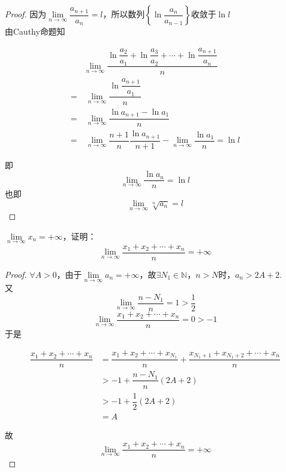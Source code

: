 \begin{proof}

    因为$\lim\limits_{n \to \infty}{\dfrac{a_{n + 1}}{a_n}} = l$，所以数列$\left\{ \ln{\dfrac{a_n}{a_{n - 1}}} \right\}$收敛于$\ln{l}$ \\
    由\textup{Cauthy}命题知
    
    \begin{align*}
        & \lim\limits_{n \to \infty}{\dfrac{\ln{\dfrac{a_2}{a_1}} + \ln{\dfrac{a_3}{a_2}} + \cdots + \ln{\dfrac{a_{n + 1}}{a_n}}}{n}} \\
        = & \ \lim\limits_{n \to \infty}{\dfrac{\ln{\dfrac{a_{n + 1}}{a_1}}}{n}} \\
        = & \ \lim\limits_{n \to \infty}{\dfrac{\ln{a_{n + 1} - \ln{a_1}}}{n}} \\
        = & \ \lim\limits_{n \to \infty}{\dfrac{n + 1}{n}\dfrac{\ln{a_{n + 1}}}{n + 1}} - \lim\limits_{n \to \infty}{\dfrac{\ln{a_1}}{n}} = \ln{l}
    \end{align*}

    即
    $$\lim\limits_{n \to \infty}{\dfrac{\ln{a_n}}{n}} = \ln{l}$$
    也即
    $$\lim\limits_{n \to \infty}{\sqrt[n]{a_n}} = l$$

\end{proof}

\begin{proposition}

    $\lim\limits_{n \to \infty}{x_n} = +\infty$，证明：
    $$\lim\limits_{n \to \infty}{\dfrac{x_1 + x_2 + \cdots + x_n}{n}} = +\infty$$

\end{proposition}

\begin{proof} 

    $\forall A > 0$，由于$\lim\limits_{n \to \infty}{a_n} = +\infty$，故$\exists N_1 \in \mathbb{N}$，$n>N$时，$a_n > 2A + 2$. \\
    又
    $$\lim\limits_{n \to \infty}{\dfrac{n - N_1}{n}} = 1 > \dfrac{1}{2}$$
    $$\lim\limits_{n \to \infty}{\dfrac{x_1 + x_2 + \cdots + x_n}{n}} = 0 > -1$$
    于是

    \begin{align*}
        \dfrac{x_1 + x_2 + \cdots + x_n}{n} & = \dfrac{x_1 + x_2 + \cdots + x_{N_1}}{n} + \dfrac{x_{N_1 + 1} + x_{N_1 + 2} + \cdots + x_n}{n} \\
        & > -1 + \dfrac{n - N_1}{n}(2A + 2) \\
        & > -1 + \dfrac{1}{2}(2A + 2) \\
        & = A 
    \end{align*}

    故
    $$\lim\limits_{n \to \infty}{\dfrac{x_1 + x_2 + \cdots + x_n}{n}} = +\infty$$
    
\end{proof} 

